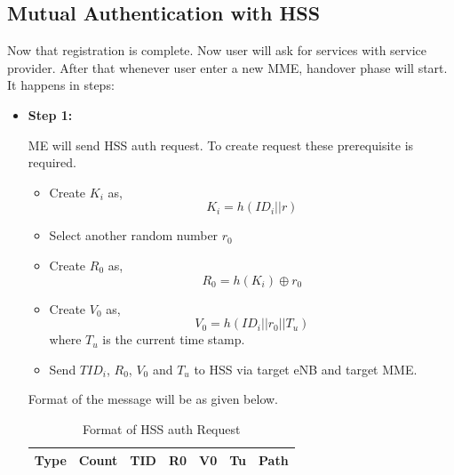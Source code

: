 \subsection{Mutual Authentication with HSS}{
    Now that registration is complete. Now user will ask for services with 
    service provider. After that whenever user enter a new MME, handover phase will start.
    It happens in steps:
    \begin{itemize}
        \item \textbf{Step 1:}{
            ME will send HSS auth request. To create request these prerequisite is required.
            \begin{itemize}
                \item Create \(K_i\) as, \[K_i = h(ID_i||r)\]
                \item Select another random number \(r_0\)
                \item Create \(R_0\) as, \[R_0 = h(K_i) \oplus r_0 \]
                \item Create \(V_0\) as, \[V_0 = h(ID_i || r_0 || T_u)\] where \(T_u\) is the current time stamp.
                \item Send \(TID_i\), \(R_0\), \(V_0\) and \(T_u\) to HSS via target eNB and target MME.
            \end{itemize}
            Format of the message will be as given below.\\
            
            \begin{table}[h]
                \centering
                \begin{tabular}{|c|c|c|c|c|c|c|}
                    \hline
                    Type & Count & TID & R0 & V0 & Tu & Path\\
                    \hline
                \end{tabular}
                \caption{Format of HSS auth Request}
            \end{table}
            
}
\end{itemize}}
